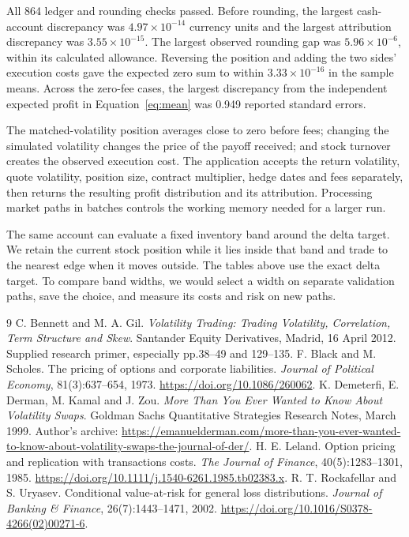 \documentclass[8pt]{strategynet-journal}
\begin{document}
\begin{SNcolumns}
All 864 ledger and rounding checks passed. Before rounding, the largest
cash-account discrepancy was $4.97\times10^{-14}$ currency units and the largest
attribution discrepancy was $3.55\times10^{-15}$. The largest observed rounding
gap was $5.96\times10^{-6}$, within its calculated allowance. Reversing the
position and adding the two sides' execution costs gave the expected zero sum
to within $3.33\times10^{-16}$ in the sample means. Across the zero-fee cases,
the largest discrepancy from the independent expected profit in
Equation~\eqref{eq:mean} was 0.949 reported standard errors.

The matched-volatility position averages close to zero before fees; changing
the simulated volatility changes the price of the payoff received; and stock
turnover creates the observed execution cost. The application accepts the return volatility, quote volatility,
position size, contract multiplier, hedge dates and fees separately, then
returns the resulting profit distribution and its attribution. Processing
market paths in batches controls the working memory needed for a larger run.

The same account can evaluate a fixed inventory band around the delta target.
We retain the current stock position while it lies inside that band and trade
to the nearest edge when it moves outside. The tables above use the exact
delta target. To compare band widths, we would select a width on separate
validation paths, save the choice, and measure its costs and risk on new paths.

\end{SNcolumns}
\clearpage
\begin{SNcolumns}
\begin{thebibliography}{9}
 C. Bennett and M. A. Gil.
\emph{Volatility Trading: Trading Volatility, Correlation, Term Structure and
Skew}. Santander Equity Derivatives, Madrid, 16 April 2012.
Supplied research primer, especially pp.38--49 and 129--135.
 F. Black and M. Scholes.
The pricing of options and corporate liabilities.
\emph{Journal of Political Economy}, 81(3):637--654, 1973.
\url{https://doi.org/10.1086/260062}.
 K. Demeterfi, E. Derman, M. Kamal and J. Zou.
\emph{More Than You Ever Wanted to Know About Volatility Swaps}.
Goldman Sachs Quantitative Strategies Research Notes, March 1999.
Author's archive:
\url{https://emanuelderman.com/more-than-you-ever-wanted-to-know-about-volatility-swaps-the-journal-of-der/}.
 H. E. Leland.
Option pricing and replication with transactions costs.
\emph{The Journal of Finance}, 40(5):1283--1301, 1985.
\url{https://doi.org/10.1111/j.1540-6261.1985.tb02383.x}.
 R. T. Rockafellar and S. Uryasev.
Conditional value-at-risk for general loss distributions.
\emph{Journal of Banking \& Finance}, 26(7):1443--1471, 2002.
\url{https://doi.org/10.1016/S0378-4266(02)00271-6}.
\end{thebibliography}
\end{SNcolumns}
\end{document}
